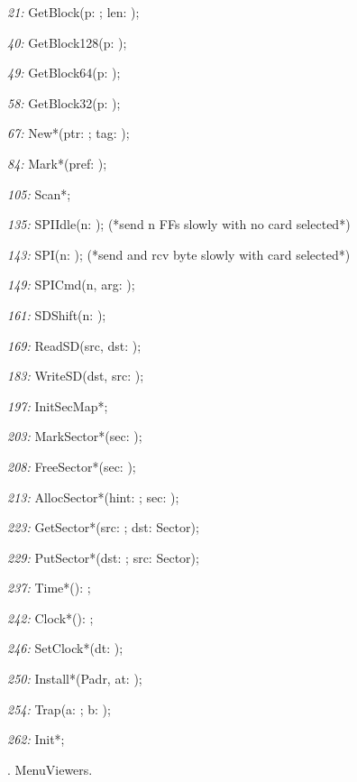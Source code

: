 \item{\it 21:} GetBlock(\VAR p: \LONGINT; len: \LONGINT);
\item{\it 40:} GetBlock128(\VAR p: \LONGINT);
\item{\it 49:} GetBlock64(\VAR p: \LONGINT);
\item{\it 58:} GetBlock32(\VAR p: \LONGINT);
\item{\it 67:} New*(\VAR ptr: \LONGINT; tag: \LONGINT);
\item{\it 84:} Mark*(pref: \LONGINT);
\item{\it 105:} Scan*;
\item{\it 135:} SPIIdle(n: \INTEGER); (*send n FFs slowly with no card selected*)
\item{\it 143:} SPI(n: \INTEGER); (*send and rcv byte slowly with card selected*)
\item{\it 149:} SPICmd(n, arg: \INTEGER);
\item{\it 161:} SDShift(\VAR n: \INTEGER);
\item{\it 169:} ReadSD(src, dst: \INTEGER);
\item{\it 183:} WriteSD(dst, src: \INTEGER);
\item{\it 197:} InitSecMap*;
\item{\it 203:} MarkSector*(sec: \INTEGER);
\item{\it 208:} FreeSector*(sec: \INTEGER);
\item{\it 213:} AllocSector*(hint: \INTEGER; \VAR sec: \INTEGER);
\item{\it 223:} GetSector*(src: \INTEGER; \VAR dst: Sector);
\item{\it 229:} PutSector*(dst: \INTEGER; \VAR src: Sector);
\item{\it 237:} Time*(): \INTEGER;
\item{\it 242:} Clock*(): \INTEGER;
\item{\it 246:} SetClock*(dt: \INTEGER);
\item{\it 250:} Install*(Padr, at: \INTEGER);
\item{\it 254:} Trap(\VAR a: \INTEGER; b: \INTEGER);
\item{\it 262:} Init*;

. MenuViewers.

